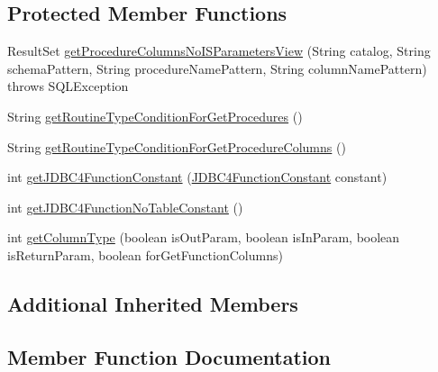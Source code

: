 \subsection*{Protected Member Functions}
\begin{DoxyCompactItemize}
\item 
Result\+Set \mbox{\hyperlink{classcom_1_1mysql_1_1jdbc_1_1_j_d_b_c4_database_meta_data_using_info_schema_aa9b5467b9c047a20b0940d295d98d9cf}{get\+Procedure\+Columns\+No\+I\+S\+Parameters\+View}} (String catalog, String schema\+Pattern, String procedure\+Name\+Pattern, String column\+Name\+Pattern)  throws S\+Q\+L\+Exception 
\item 
String \mbox{\hyperlink{classcom_1_1mysql_1_1jdbc_1_1_j_d_b_c4_database_meta_data_using_info_schema_a358fde130161d1bd80a1352e809b8b0b}{get\+Routine\+Type\+Condition\+For\+Get\+Procedures}} ()
\item 
String \mbox{\hyperlink{classcom_1_1mysql_1_1jdbc_1_1_j_d_b_c4_database_meta_data_using_info_schema_a1424ef7c87eba487fe66355836863d8e}{get\+Routine\+Type\+Condition\+For\+Get\+Procedure\+Columns}} ()
\item 
int \mbox{\hyperlink{classcom_1_1mysql_1_1jdbc_1_1_j_d_b_c4_database_meta_data_using_info_schema_aff798ecd15c3d9daa81bc49f9ba9aa48}{get\+J\+D\+B\+C4\+Function\+Constant}} (\mbox{\hyperlink{enumcom_1_1mysql_1_1jdbc_1_1_database_meta_data_using_info_schema_1_1_j_d_b_c4_function_constant}{J\+D\+B\+C4\+Function\+Constant}} constant)
\item 
int \mbox{\hyperlink{classcom_1_1mysql_1_1jdbc_1_1_j_d_b_c4_database_meta_data_using_info_schema_afd840700d26d2c6ddeb00041cecfe90f}{get\+J\+D\+B\+C4\+Function\+No\+Table\+Constant}} ()
\item 
int \mbox{\hyperlink{classcom_1_1mysql_1_1jdbc_1_1_j_d_b_c4_database_meta_data_using_info_schema_af4f257273acbcd56b426db37f2fdf11c}{get\+Column\+Type}} (boolean is\+Out\+Param, boolean is\+In\+Param, boolean is\+Return\+Param, boolean for\+Get\+Function\+Columns)
\end{DoxyCompactItemize}
\subsection*{Additional Inherited Members}


\subsection{Member Function Documentation}
\mbox{\label{classcom_1_1mysql_1_1jdbc_1_1_j_d_b_c4_database_meta_data_using_info_schema_af4f257273acbcd56b426db37f2fdf11c}} 
